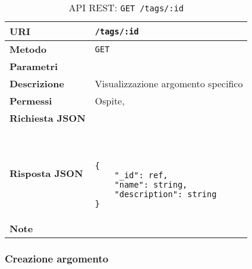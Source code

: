         \begin{table}[H]
            \begin{center}
                \begin{tabular}{p{} p{}}
                    \toprule
                    \textbf{URI} & \texttt{/tags/:id} \\ \midrule
                    \textbf{Metodo} & \texttt{GET} \\ \midrule
                    \textbf{Parametri} & \\ \midrule
                    \textbf{Descrizione} & Visualizzazione argomento specifico \\ \midrule
                    \textbf{Permessi} & Ospite, \\ \midrule
                    \textbf{Richiesta JSON} & \\ \midrule
                    \textbf{Risposta JSON} & \
                        \begin{lstlisting}[basicstyle={\ttfamily}]
{
    "_id": ref,
    "name": string,
    "description": string
}
                        \end{lstlisting}
                        \\ \midrule
                    \textbf{Note} & \\
                    \bottomrule
                \end{tabular}
                \caption{API REST: \texttt{GET /tags/:id}}
            \end{center}
        \end{table}

    \subsubsection{Creazione argomento}
    
